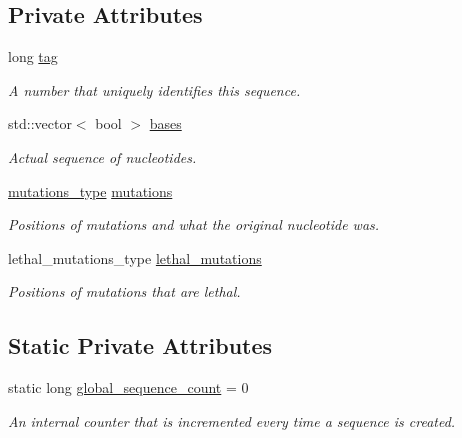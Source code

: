 \subsection*{Private Attributes}
\begin{DoxyCompactItemize}
\item 
long \mbox{\hyperlink{classrcombinator_1_1Sequence_a9f9a2f4654d8b0e0cdb3061b9e0775d7}{tag}}
\begin{DoxyCompactList}\small\item\em A number that uniquely identifies this sequence. \end{DoxyCompactList}\item 
std\+::vector$<$ bool $>$ \mbox{\hyperlink{classrcombinator_1_1Sequence_ab37aa0bdc97b3d923407e3a7e17b3209}{bases}}
\begin{DoxyCompactList}\small\item\em Actual sequence of nucleotides. \end{DoxyCompactList}\item 
\mbox{\hyperlink{classrcombinator_1_1Sequence_a95c6d1eea79f9551118a4c988433e5b7}{mutations\+\_\+type}} \mbox{\hyperlink{classrcombinator_1_1Sequence_a8aac49ef635b95fe0088e5fb59e2bce7}{mutations}}
\begin{DoxyCompactList}\small\item\em Positions of mutations and what the {\itshape original} nucleotide was. \end{DoxyCompactList}\item 
lethal\+\_\+mutations\+\_\+type \mbox{\hyperlink{classrcombinator_1_1Sequence_abbef2567c1f68239c80769db85455b00}{lethal\+\_\+mutations}}
\begin{DoxyCompactList}\small\item\em Positions of mutations that are lethal. \end{DoxyCompactList}\end{DoxyCompactItemize}
\subsection*{Static Private Attributes}
\begin{DoxyCompactItemize}
\item 
static long \mbox{\hyperlink{classrcombinator_1_1Sequence_abb45023862671bbc450bdea543e72165}{global\+\_\+sequence\+\_\+count}} = 0
\begin{DoxyCompactList}\small\item\em An internal counter that is incremented every time a sequence is created. \end{DoxyCompactList}\end{DoxyCompactItemize}
